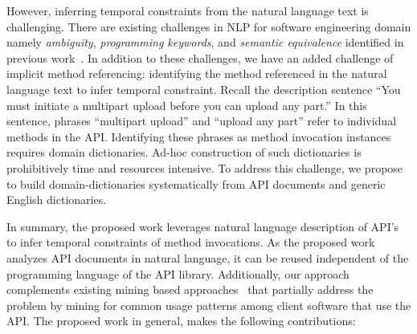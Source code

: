 However, inferring temporal constraints from the natural language text is challenging. 
There are existing challenges in NLP for software engineering domain namely \textit{ambiguity}, \textit{programming keywords}, and \textit{semantic equivalence} identified in previous work~\cite{pandita12:inferring}.
In addition to these challenges, we have an added challenge of 
implicit method referencing: identifying the method referenced in the natural language text to infer temporal constraint.
Recall the description sentence ``You must initiate a multipart upload before you can upload any part.''
In this sentence, phrases ``multipart upload'' and ``upload any part'' refer to individual methods in the API.
Identifying these phrases as method invocation instances requires domain dictionaries.
Ad-hoc construction of such dictionaries is prohibitively time and resources intensive.
To address this challenge, we propose to build domain-dictionaries systematically from API documents and generic English dictionaries.  

In summary, the proposed work leverages natural language description of API's to infer temporal constraints of method invocations.
As the proposed work analyzes API documents in natural language, it can be reused independent of the programming language of the API library.
Additionally, our approach complements existing mining based approaches~\cite{buse2012synthesizing, thummalapenta07parseweb, Wang:2013:MSR, Zhong:2009:MMR} that partially address the problem by mining for common usage patterns among client software that use the API.
The proposed work in general, makes the following contributions:


